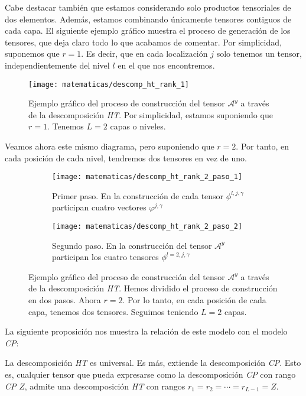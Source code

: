 Cabe destacar también que estamos considerando solo productos tensoriales de dos elementos. Además, estamos combinando únicamente tensores contiguos de cada capa. El siguiente ejemplo gráfico muestra el proceso de generación de los tensores, que deja claro todo lo que acabamos de comentar. Por simplicidad, suponemos que $r = 1$. Es decir, que en cada localización $j$ solo tenemos un tensor, independientemente del nivel $l$ en el que nos encontremos.

\begin{figure}[H]
	\centering
	\texttt{[image: matematicas/descomp\_ht\_rank\_1]}
	\caption{Ejemplo gráfico del proceso de construcción del tensor $\mathcal{A}^y$ a través de la descomposición \textit{HT}. Por simplicidad, estamos suponiendo que $r = 1$. Tenemos $L = 2$ capas o niveles.}
	\label{img:diagrama_ht_simple}
\end{figure}

Veamos ahora este mismo diagrama, pero suponiendo que $r = 2$. Por tanto, en cada posición de cada nivel, tendremos dos tensores en vez de uno.

\begin{figure}[H]
	\centering
	\ajustarsubcaptions
	\begin{subfigure}{.5\textwidth}
		\centering
		\texttt{[image: matematicas/descomp\_ht\_rank\_2\_paso\_1]}
		\caption{Primer paso. En la construcción de cada tensor $\phi^{l, j, \gamma}$ participan cuatro vectores $\varphi^{j, \gamma}$}
	\end{subfigure}%
	\begin{subfigure}{.5\textwidth}
		\centering
		\texttt{[image: matematicas/descomp\_ht\_rank\_2\_paso\_2]}
		\caption{Segundo paso. En la construcción del tensor $\mathcal{A}^y$ participan los cuatro tensores $\phi^{l=2, j, \gamma}$}
	\end{subfigure}
	\caption{Ejemplo gráfico del proceso de construcción del tensor $\mathcal{A}^y$ a través de la descomposición \textit{HT}. Hemos dividido el proceso de construcción en dos pasos. Ahora $r = 2$. Por lo tanto, en cada posición de cada capa, tenemos dos tensores. Seguimos teniendo $L = 2$ capas.}
	\label{img:diagrama_ht_complejo}
\end{figure}

La siguiente proposición nos muestra la relación de este modelo con el modelo \textit{CP}:

\begin{proposicion}
	La descomposición \textit{HT} es universal. Es más, extiende la descomposición \textit{CP}. Esto es, cualquier tensor que pueda expresarse como la descomposición \textit{CP} con rango \textit{CP} $Z$, admite una descomposición \textit{HT} con rangos $r_1 = r_2 = \cdots = r_{L - 1} = Z$.
\end{proposicion}

